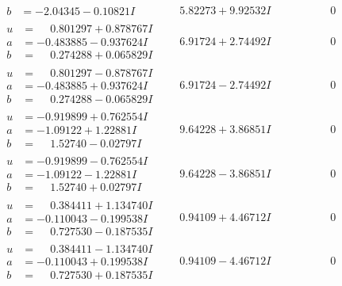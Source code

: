 \documentclass[1p]{elsarticle_modified}
\theoremstyle{definition}
\begin{document}
$$\begin{array}{c|c|c}
\begin{aligned}
b &= -2.04345 - 0.10821 I\end{aligned}
 & \phantom{-}5.82273 + 9.92532 I & \phantom{-0.000000 } 0 \\ \hline\begin{aligned}
u &= \phantom{-}0.801297 + 0.878767 I \\
a &= -0.483885 - 0.937624 I \\
b &= \phantom{-}0.274288 + 0.065829 I\end{aligned}
 & \phantom{-}6.91724 + 2.74492 I & \phantom{-0.000000 } 0 \\ \hline\begin{aligned}
u &= \phantom{-}0.801297 - 0.878767 I \\
a &= -0.483885 + 0.937624 I \\
b &= \phantom{-}0.274288 - 0.065829 I\end{aligned}
 & \phantom{-}6.91724 - 2.74492 I & \phantom{-0.000000 } 0 \\ \hline\begin{aligned}
u &= -0.919899 + 0.762554 I \\
a &= -1.09122 + 1.22881 I \\
b &= \phantom{-}1.52740 - 0.02797 I\end{aligned}
 & \phantom{-}9.64228 + 3.86851 I & \phantom{-0.000000 } 0 \\ \hline\begin{aligned}
u &= -0.919899 - 0.762554 I \\
a &= -1.09122 - 1.22881 I \\
b &= \phantom{-}1.52740 + 0.02797 I\end{aligned}
 & \phantom{-}9.64228 - 3.86851 I & \phantom{-0.000000 } 0 \\ \hline\begin{aligned}
u &= \phantom{-}0.384411 + 1.134740 I \\
a &= -0.110043 - 0.199538 I \\
b &= \phantom{-}0.727530 - 0.187535 I\end{aligned}
 & \phantom{-}0.94109 + 4.46712 I & \phantom{-0.000000 } 0 \\ \hline\begin{aligned}
u &= \phantom{-}0.384411 - 1.134740 I \\
a &= -0.110043 + 0.199538 I \\
b &= \phantom{-}0.727530 + 0.187535 I\end{aligned}
 & \phantom{-}0.94109 - 4.46712 I & \phantom{-0.000000 } 0 \\ \hline\begin{aligned}

\end{aligned}
\end{array}$$
\end{document}
